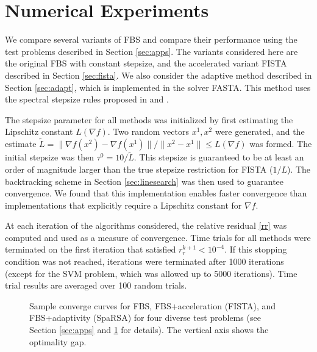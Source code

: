 \documentclass{amsart}
\newcommand{\kp}{^{k+1}}
\theoremstyle{definition}
\begin{document}
\section{Numerical Experiments} \label{sec:num}

We compare several variants of FBS and compare their performance using the test problems described in Section \ref{sec:apps}.  The variants considered here are the original FBS with constant stepsize, and the accelerated variant FISTA described in Section \ref{sec:fista}.  We also consider the adaptive method described in Section \ref{sec:adapt}, which is implemented in the solver FASTA.  This method uses the spectral stepsize rules proposed in \cite{WNF09} and \cite{ZGD06}.

The stepsize parameter for all methods was initialized by first estimating the Lipschitz constant $L(\nabla f).$ Two random vectors $x^1,x^2$ were generated, and the estimate $ \tilde L= \|\nabla f(x^2) - \nabla f (x^1)\|/ \| x^2-x^1 \| \le  L(\nabla f)$ was formed. The initial stepsize was then $\tau^0 = 10/\tilde L.$  This stepsize is guaranteed to be at least an order of magnitude larger than the true stepsize restriction for FISTA ($1/L$).  The backtracking scheme in Section \ref{sec:linesearch} was then used to guarantee convergence.  We found that this implementation enables faster convergence than implementations that explicitly require a Lipschitz constant for $\nabla f$.

 At each iteration of the algorithms considered, the relative residual \eqref{rr} was computed and used as a measure of convergence.  Time trials for all methods were terminated on the first iteration that satisfied $r\kp_r<10^{-4}.$ If this stopping condition was not reached, iterations were terminated after 1000 iterations (except for the SVM problem, which was allowed up to 5000 iterations).  Time trial results are averaged over 100 random trials.
 
\begin{figure}[t]
\vspace{-0.2cm}
\centering
{}
\hspace{0.9cm}
\vspace{-0.2cm}
\hspace{0.9cm}
\vspace{-0.1cm}
\caption{Sample converge curves for FBS, FBS+acceleration (FISTA), and FBS+adaptivity (SpaRSA) for four diverse test problems (see Section \ref{sec:apps} and \ref{sec:num} for details). The vertical axis shows the optimality gap. }
\label{fig:curves}
\vspace{-0.3cm}
\end{figure} 
\end{document}

